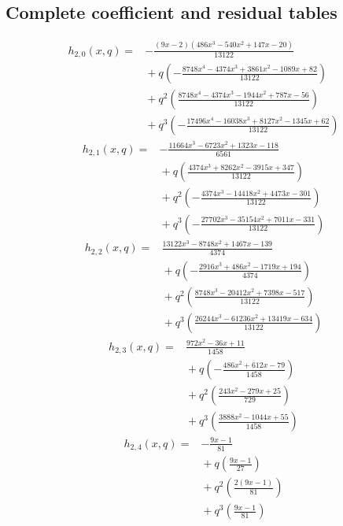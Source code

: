\documentclass[11pt]{article}
\begin{document}
\subsection{Complete coefficient and residual tables}
\[
\begin{split}
h_{2,0}(x,q)={}&- \frac{\left(9 x - 2\right) \left(486 x^{3} - 540 x^{2} + 147 x - 20\right)}{13122}\\
&{}+q\left(- \frac{8748 x^{4} - 4374 x^{3} + 3861 x^{2} - 1089 x + 82}{13122}\right)\\
&{}+q^{2}\left(\frac{8748 x^{4} - 4374 x^{3} - 1944 x^{2} + 787 x - 56}{13122}\right)\\
&{}+q^{3}\left(- \frac{17496 x^{4} - 16038 x^{3} + 8127 x^{2} - 1345 x + 62}{13122}\right)
\end{split}
\tag{ANP19}
\]
\[
\begin{split}
h_{2,1}(x,q)={}&- \frac{11664 x^{3} - 6723 x^{2} + 1323 x - 118}{6561}\\
&{}+q\left(\frac{4374 x^{3} + 8262 x^{2} - 3915 x + 347}{13122}\right)\\
&{}+q^{2}\left(- \frac{4374 x^{3} - 14418 x^{2} + 4473 x - 301}{13122}\right)\\
&{}+q^{3}\left(- \frac{27702 x^{3} - 35154 x^{2} + 7011 x - 331}{13122}\right)
\end{split}
\tag{ANP20}
\]
\[
\begin{split}
h_{2,2}(x,q)={}&\frac{13122 x^{3} - 8748 x^{2} + 1467 x - 139}{4374}\\
&{}+q\left(- \frac{2916 x^{3} + 486 x^{2} - 1719 x + 194}{4374}\right)\\
&{}+q^{2}\left(\frac{8748 x^{3} - 20412 x^{2} + 7398 x - 517}{13122}\right)\\
&{}+q^{3}\left(\frac{26244 x^{3} - 61236 x^{2} + 13419 x - 634}{13122}\right)
\end{split}
\tag{ANP21}
\]
\[
\begin{split}
h_{2,3}(x,q)={}&\frac{972 x^{2} - 36 x + 11}{1458}\\
&{}+q\left(- \frac{486 x^{2} + 612 x - 79}{1458}\right)\\
&{}+q^{2}\left(\frac{243 x^{2} - 279 x + 25}{729}\right)\\
&{}+q^{3}\left(\frac{3888 x^{2} - 1044 x + 55}{1458}\right)
\end{split}
\tag{ANP22}
\]
\[
\begin{split}
h_{2,4}(x,q)={}&- \frac{9 x - 1}{81}\\
&{}+q\left(\frac{9 x - 1}{27}\right)\\
&{}+q^{2}\left(\frac{2 \left(9 x - 1\right)}{81}\right)\\
&{}+q^{3}\left(\frac{9 x - 1}{81}\right)
\end{split}
\tag{ANP23}
\]
\end{document}
